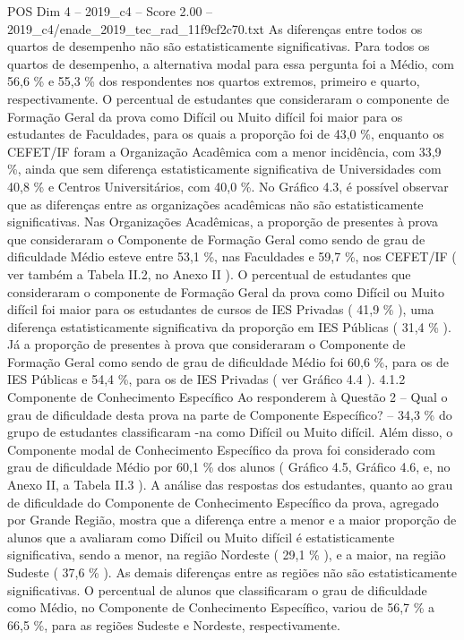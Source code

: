 \begin{textsample}{POS Dim 4 – 2019\_c4 – Score 2.00 – 2019\_c4/enade\_2019\_tec\_rad\_11f9cf2c70.txt}
As diferenças entre todos os quartos de desempenho não são estatisticamente significativas.
Para todos os quartos de desempenho, a alternativa modal para essa pergunta foi a Médio, com 56,6 \% e 55,3 \% dos respondentes nos quartos extremos, primeiro e quarto, respectivamente.
O percentual de estudantes que consideraram o componente de Formação Geral da prova como Difícil ou Muito difícil foi maior para os estudantes de Faculdades, para os quais a proporção foi de 43,0 \%, enquanto os CEFET/IF foram a Organização Acadêmica com a menor incidência, com 33,9 \%, ainda que sem diferença estatisticamente significativa de Universidades com 40,8 \% e Centros Universitários, com 40,0 \%.
No Gráfico 4.3, é possível observar que as diferenças entre as organizações acadêmicas não são estatisticamente significativas.
Nas Organizações Acadêmicas, a proporção de presentes à prova que consideraram o Componente de Formação Geral como sendo de grau de dificuldade Médio esteve entre 53,1 \%, nas Faculdades e 59,7 \%, nos CEFET/IF ( ver também a Tabela II.2, no Anexo II ).
O percentual de estudantes que consideraram o componente de Formação Geral da prova como Difícil ou Muito difícil foi maior para os estudantes de cursos de IES Privadas ( 41,9 \% ), uma diferença estatisticamente significativa da proporção em IES Públicas ( 31,4 \% ).
Já a proporção de presentes à prova que consideraram o Componente de Formação Geral como sendo de grau de dificuldade Médio foi 60,6 \%, para os de IES Públicas e 54,4 \%, para os de IES Privadas ( ver Gráfico 4.4 ). 4.1.2 Componente de Conhecimento Específico Ao responderem à Questão 2 – Qual o grau de dificuldade desta prova na parte de Componente Específico? – 34,3 \% do grupo de estudantes classificaram -na como Difícil ou Muito difícil.
Além disso, o Componente modal de Conhecimento Específico da prova foi considerado com grau de dificuldade Médio por 60,1 \% dos alunos ( Gráfico 4.5, Gráfico 4.6, e, no Anexo II, a Tabela II.3 ).
A análise das respostas dos estudantes, quanto ao grau de dificuldade do Componente de Conhecimento Específico da prova, agregado por Grande Região, mostra que a diferença entre a menor e a maior proporção de alunos que a avaliaram como Difícil ou Muito difícil é estatisticamente significativa, sendo a menor, na região Nordeste ( 29,1 \% ), e a maior, na região Sudeste ( 37,6 \% ).
As demais diferenças entre as regiões não são estatisticamente significativas.
O percentual de alunos que classificaram o grau de dificuldade como Médio, no Componente de Conhecimento Específico, variou de 56,7 \% a 66,5 \%, para as regiões Sudeste e Nordeste, respectivamente.

\end{textsample}
